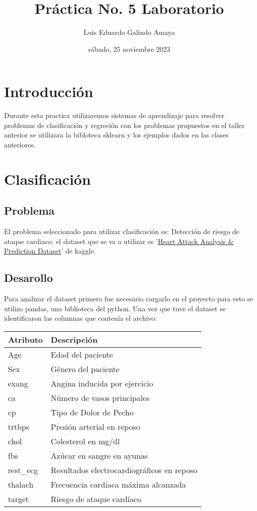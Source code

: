 \documentclass[11pt]{article}
\author{Luis Eduardo Galindo Amaya}
\date{sábado, 25 noviembre 2023}
\title{Práctica No. 5 Laboratorio}
\begin{document}
\tableofcontents
\pagebreak



\section{Introducción}
\label{sec:org9ccd984}
Durante esta practica utilizaremos sistemas de aprendizaje para
resolver problemas de clasificación y regreción con los problemas
propuestos en el taller anterior se utilizara la bibloteca sklearn y
los ejemplos dados en las clases anteriores. 

\section{Clasificación}
\label{sec:org2acc86e}
\subsection{Problema}
\label{sec:org11032a5}
El problema seleccionado para utilizar clasificación es: Detección de
riesgo de ataque cardiaco. el dataset que se va a utilizar es '\href{https://www.kaggle.com/datasets/rashikrahmanpritom/heart-attack-analysis-prediction-dataset?select=heart.css}{Heart Attack
Analysis \& Prediction Dataset}' de kaggle.

\subsection{Desarollo}
\label{sec:org81ec618}
Para analizar el dataset primero fue necesario cargarlo en el proyecto
para esto se utilizo pandas, una biblioteca del python. Una vez que
tuve el dataset se identificaron las columnas que contenía el archivo:

\begin{center}
\begin{tabularx}{0.8\textwidth}{l|l}
Atributo & Descripción\\
\hline
Age & Edad del paciente\\
Sex & Género del paciente\\
exang & Angina inducida por ejercicio\\
ca & Número de vasos principales\\
cp & Tipo de Dolor de Pecho\\
trtbps & Presión arterial en reposo\\
chol & Colesterol en mg/dl\\
fbs & Azúcar en sangre en ayunas\\
rest\_ecg & Resultados electrocardiográficos en reposo\\
thalach & Frecuencia cardíaca máxima alcanzada\\
target & Riesgo de ataque cardíaco\\
\end{tabularx}

\end{center}
\end{document}
